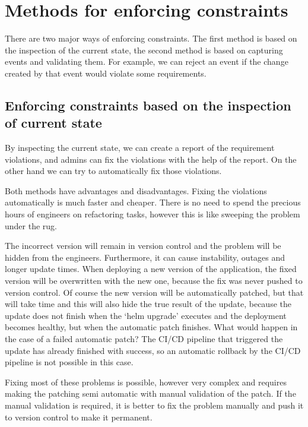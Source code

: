 \setlength{\parindent}{0pt}
\setlength{\parskip}{0.6em}

\chapter{Methods for enforcing constraints}
\label{chap:enforcingMethods}

There are two major ways of enforcing constraints. The first method is based on the inspection of the current state, the second method is based on capturing events and validating them. For example, we can reject an event if the change created by that event would violate some requirements.

\section[State inspection based]{Enforcing constraints based on the inspection of current state}

By inspecting the current state, we can create a report of the requirement violations, and admins can fix the violations with the help of the report. On the other hand we can try to automatically fix those violations.

Both methods have advantages and disadvantages. Fixing the violations automatically is much faster and cheaper. There is no need to spend the precious hours of engineers on refactoring tasks, however this is like sweeping the problem under the rug. 

The incorrect version will remain in version control and the problem will be hidden from the engineers. Furthermore, it can cause instability, outages and longer update times. When deploying a new version of the application, the fixed version will be overwritten with the new one, because the fix was never pushed to version control. Of course the new version will be automatically patched, but that will take time and this will also hide the true result of the update, because the update does not finish when the `helm upgrade' executes and the deployment becomes healthy, but when the automatic patch finishes. What would happen in the case of a failed automatic patch? The CI/CD pipeline that triggered the update has already finished with success, so an automatic rollback by the CI/CD pipeline is not possible in this case.

Fixing most of these problems is possible, however very complex and requires making the patching semi automatic with manual validation of the patch. If the manual validation is required, it is better to fix the problem manually and push it to version control to make it permanent.





